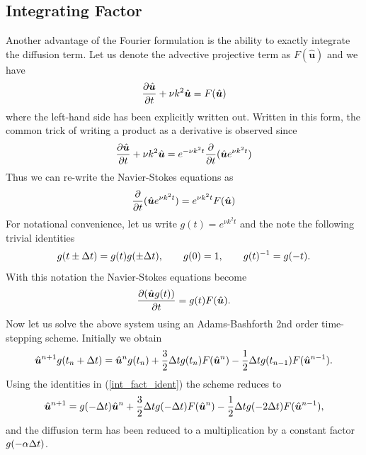 \subsection{Integrating Factor}
Another advantage of the Fourier formulation is the ability to exactly integrate the diffusion term. Let us denote the advective projective term as $F(\hat{\bm{u}})$ and we have
\begin{align}
\frac{\partial \hat{\bm{u}}}{\partial t} + \nu k^{2}\hat{\bm{u}} = F(\hat{\bm{u}}) 
\end{align}
where the left-hand side has been explicitly written out. Written in this form, the common trick of writing a product as a derivative is observed since
\begin{align}
 \frac{\partial \hat{\bm{u}}}{\partial t} + \nu k^{2}\hat{\bm{u}}= e^{-\nu k^{2}t}\frac{\partial }{\partial t}(\hat{\bm{u}} e^{\nu k^{2}t})
\end{align}
Thus we can re-write the Navier-Stokes equations as 
\begin{align}
\frac{\partial }{\partial t}(\hat{\bm{u}} e^{\nu k^{2}t})= e^{\nu k^{2}t}F(\hat{\bm{u}}) 
\end{align}
For notational convenience, let us write $g(t) = e^{\nu k^{2}t}$ and the note the following trivial identities
\begin{align}
g(t\pm\Delta t) = g(t)g(\pm\Delta t),\qquad g(0) = 1, \qquad g(t)^{-1} = g(-t).\label{int_fact_ident}
\end{align}
With this notation the Navier-Stokes equations become
\begin{align}
\frac{\partial (\hat{\bm{u}} g(t))}{\partial t} = g(t)F(\hat{\bm{u}}).
\end{align}
 Now let us solve the above system using an Adams-Bashforth 2nd order time-stepping scheme. Initially we obtain
\begin{align}
\hat{\bm{u}}^{n+1}g(t_{n}+\Delta t) = \hat{\bm{u}}^{n}g(t_{n}) + \frac{3}{2}\Delta t g(t_{n})F(\hat{\bm{u}}^{n}) - \frac{1}{2}\Delta t g(t_{n-1})F(\hat{\bm{u}}^{n-1}).
\end{align}
Using the identities in (\ref{int_fact_ident}) the scheme reduces to
\begin{align}
\hat{\bm{u}}^{n+1} = g(-\Delta t)\hat{\bm{u}}^{n} + \frac{3}{2}\Delta t g(-\Delta t)F(\hat{\bm{u}}^{n}) - \frac{1}{2}\Delta t g(-2\Delta t)F(\hat{\bm{u}}^{n-1}),
\end{align}
and the diffusion term has been reduced to a multiplication by a constant factor $g(-\alpha\Delta t)$.

